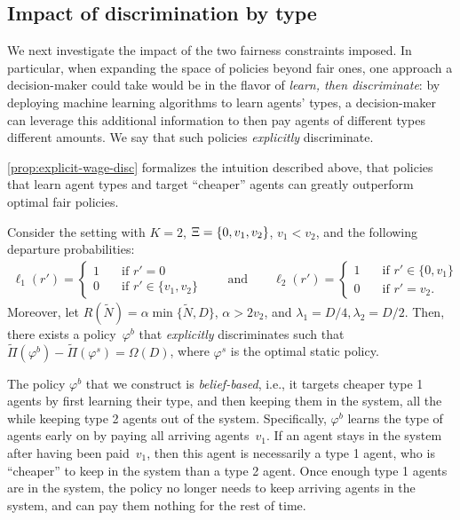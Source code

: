 \documentclass[12pt]{article}
\begin{document}
\subsection{Impact of discrimination by type}\label{sec:pof}

We next investigate the impact of the two fairness constraints imposed. In particular, when expanding the space of policies beyond fair ones, one approach a decision-maker could take would be in the flavor of \emph{learn, then discriminate}: by deploying machine learning algorithms to learn agents' types, a decision-maker can leverage this additional information to then pay agents of different types different amounts. We say that such policies {\it explicitly}  discriminate. 

{


\cref{prop:explicit-wage-disc} formalizes the intuition described above, that policies that learn agent types and target ``cheaper'' agents can greatly outperform optimal fair policies. 


\begin{proposition}\label{prop:explicit-wage-disc}
Consider the setting with $K = 2$, $\Xi = \{0,v_1,v_2\}$, $v_1 < v_2$, and the following departure probabilities:
\begin{align*}
    \ell_1(r') = \begin{cases}
    1 \quad &\mbox{if }r' = 0 \\
    0 \quad &\mbox{if }r' \in \{v_1,v_2\} 
    \end{cases} \qquad \text{and} \qquad 
    \ell_2(r') = \begin{cases}
    1 \quad &\mbox{if }r' \in \{0,v_1\}\\
    0 \quad &\mbox{if }r' = v_2.
    \end{cases}
\end{align*}
Moreover, let $R(\widetilde{N}) = \alpha \min\{\widetilde{N}, D\}$, $\alpha > 2v_2$, and {$\lambda_1 = D/4, \lambda_2 = D/2$}.
Then, there exists a policy~$\varphi^b$ that {\it explicitly}  discriminates such that $\widetilde{\Pi}(\varphi^b) - \widetilde{\Pi}(\varphi^s) = \Omega(D)$, where $\varphi^s$ is the optimal static policy. 
\end{proposition}

The policy $\varphi^b$ that we construct is {\it belief-based}, i.e., it targets cheaper type 1 agents by first learning their type, and then keeping them in the system, all the while keeping type 2 agents out of the system. Specifically, $\varphi^b$ learns the type of agents early on by paying all arriving agents~$v_1$. If an agent stays in the system after having been paid~$v_1$, then this agent is necessarily a type 1 agent, who is ``cheaper'' to keep in the system than a type 2 agent. Once enough type 1 agents are in the system, the policy no longer needs to keep arriving agents in the system, and can pay them nothing for the rest of time.

}
\end{document}
